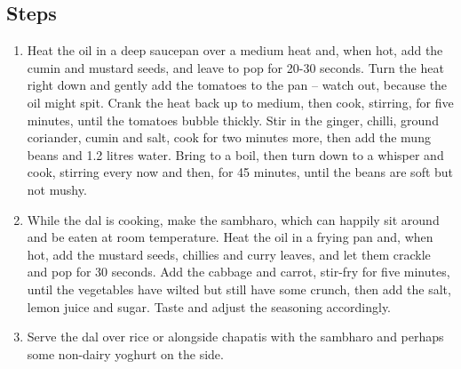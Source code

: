 \documentclass{book}
\begin{document}
\subsection*{Steps}
\begin{enumerate}
\item Heat the oil in a deep saucepan over a medium heat and, when hot, add the cumin and mustard seeds, and leave to pop for 20-30 seconds. Turn the heat right down and gently add the tomatoes to the pan – watch out, because the oil might spit. Crank the heat back up to medium, then cook, stirring, for five minutes, until the tomatoes bubble thickly. Stir in the ginger, chilli, ground coriander, cumin and salt, cook for two minutes more, then add the mung beans and 1.2 litres water. Bring to a boil, then turn down to a whisper and cook, stirring every now and then, for 45 minutes, until the beans are soft but not mushy.
\item While the dal is cooking, make the sambharo, which can happily sit around and be eaten at room temperature. Heat the oil in a frying pan and, when hot, add the mustard seeds, chillies and curry leaves, and let them crackle and pop for 30 seconds. Add the cabbage and carrot, stir-fry for five minutes, until the vegetables have wilted but still have some crunch, then add the salt, lemon juice and sugar. Taste and adjust the seasoning accordingly.
\item Serve the dal over rice or alongside chapatis with the sambharo and perhaps some non-dairy yoghurt on the side.
\end{enumerate}
\newpage
\end{document}
